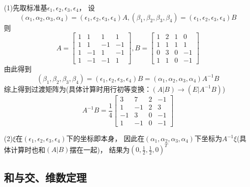 \begin{solution}
  (1)先取标准基$\epsilon_1,\epsilon_2,\epsilon_3,\epsilon_4$，
  设
  \begin{equation*}
    (\alpha_1,\alpha_2,\alpha_3,\alpha_4) = (\epsilon_1,\epsilon_2,\epsilon_3,\epsilon_4)A,
    (\beta_1,\beta_2,\beta_3,\beta_4) = (\epsilon_1,\epsilon_2,\epsilon_3,\epsilon_4)B
  \end{equation*}
  则
  \begin{equation*}
    A = \left[
      \begin{array}{cccc}
        1&1&1&1 \\
         1&1&-1&-1 \\
         1&-1&1&-1 \\
         1&-1&-1&1
      \end{array}
    \right],
    B = \left[
      \begin{array}{cccc}
        1&2&1&0 \\
         1&1&1&1 \\
         0&3&0&-1 \\
         1&1&0&-1
      \end{array}
    \right]
  \end{equation*}
  由此得到
  \begin{equation*}
    (\beta_1,\beta_2,\beta_3,\beta_4) = (\epsilon_1,\epsilon_2,\epsilon_3,\epsilon_4)B = (\alpha_1,\alpha_2,\alpha_3,\alpha_4)A^{-1}B
  \end{equation*}
  综上得到过渡矩阵为(具体计算时用行初等变换：$(A|B) \rightarrow (E|A^{-1}B)$)
  \begin{equation*}
    A^{-1}B = \frac{1}{4} \left[
      \begin{array}{cccc}
        3&7&2&-1 \\
         1&-1&2&3 \\
         -1&3&0&-1 \\
         1&-1&0&-1
      \end{array}
    \right]
  \end{equation*}

  (2)$\xi$在$(\epsilon_1,\epsilon_2,\epsilon_3,\epsilon_4)$下的坐标即本身，
  因此在$(\alpha_1,\alpha_2,\alpha_3,\alpha_4)$下坐标为$A^{-1}\xi$(具体计算时也和$(A|B)$摆在一起)，
  结果为$(0, \frac{1}{2}, \frac{1}{2},0)^T$
\end{solution}

\subsection{和与交、维数定理}

